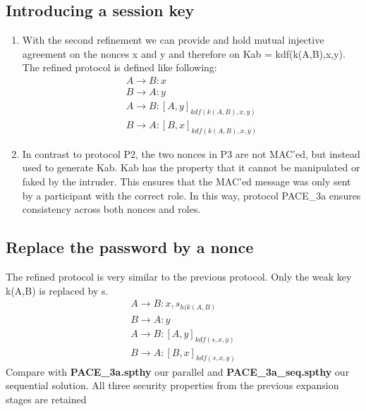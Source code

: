 \documentclass[a4paper,11pt]{scrartcl}
\begin{document}
\subsection{Introducing a session key}
\begin{enumerate}[label=\alph*)]
	\item With the second refinement we can provide and hold mutual injective agreement on the nonces x and y and therefore on Kab = kdf(k(A,B),x,y). The refined protocol is 			defined like following:
	\begin{align*}
	A \rightarrow B: x\\
	B \rightarrow A: y\\
	A \rightarrow B: [A,  y]_{kdf(k(A,  B), x, y)}\\
	B \rightarrow A: [B,  x]_{kdf(k(A,  B), x, y)}
	\end{align*}
	\item In contrast to protocol P2, the two nonces in P3 are not MAC'ed, but instead used to generate Kab. Kab has the property that it cannot be manipulated or faked by the 			intruder. This ensures that the MAC'ed message was only sent by a participant with the correct role. In this way, protocol PACE_3a ensures consistency across both nonces 			and roles. 
\end{enumerate}
\subsection{Replace the password by a nonce}
The refined protocol is very similar to the previous protocol. Only the weak key k(A,B) is replaced by s.
	\begin{align*}
	A \rightarrow B: x, {s}_{h(k(A,B)}\\
	B \rightarrow A: y\\
	A \rightarrow B: [A,  y]_{kdf(s, x, y)}\\
	B \rightarrow A: [B,  x]_{kdf(s, x, y)}
	\end{align*}
	Compare with \textbf{PACE_3a.spthy} our parallel and \textbf{PACE_3a_seq.spthy} our sequential solution.  All three security properties from the previous expansion stages 		are retained
\end{document}
